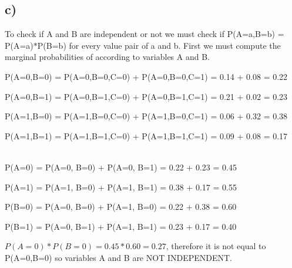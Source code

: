 \documentclass[12pt]{article}
\begin{document}
\subsection*{c)}
To check if A and B are independent or not we must check if P(A=a,B=b) = P(A=a)$\ast$P(B=b) for every value pair of a and b. First we must compute the marginal probabilities of according to variables A and B.\\ \par 
P(A=0,B=0) = P(A=0,B=0,C=0) + P(A=0,B=0,C=1) = 0.14 + 0.08 = 0.22\\ \par 
P(A=0,B=1) = P(A=0,B=1,C=0) + P(A=0,B=1,C=1) = 0.21 + 0.02 = 0.23\\ \par 
P(A=1,B=0) = P(A=1,B=0,C=0) + P(A=1,B=0,C=1) = 0.06 + 0.32 = 0.38\\ \par 
P(A=1,B=1) = P(A=1,B=1,C=0) + P(A=1,B=1,C=1) = 0.09 + 0.08 = 0.17\\ \\ \par
P(A=0) = P(A=0, B=0) + P(A=0, B=1) = 0.22 + 0.23 = 0.45\\ \par 
P(A=1) = P(A=1, B=0) + P(A=1, B=1) = 0.38 + 0.17 = 0.55\\ \par 
P(B=0) = P(A=0, B=0) + P(A=1, B=0) = 0.22 + 0.38 = 0.60\\ \par 
P(B=1) = P(A=0, B=1) + P(A=1, B=1) = 0.23 + 0.17 = 0.40\\ \par
$P(A=0) \ast P(B=0) = 0.45 \ast 0.60 = 0.27$, therefore it is not equal to P(A=0,B=0) so variables A and B are NOT INDEPENDENT.
\end{document}
